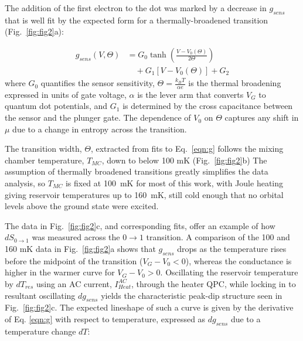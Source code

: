 \documentclass[twocolumn,showpacs,preprintnumbers,amsmath,amssymb,pra,aps,superscriptaddress]{revtex4-1}
\begin{document}
The addition of the first electron to the dot was marked by a decrease in $g_{sens}$ that is well fit by the expected form for a thermally-broadened transition (Fig.~\ref{fig:fig2}a):

%
\begin{align}
\label{eqn:g}
        g_{sens}(V,\Theta) &= G_0 \tanh\left(\frac{V-V_0(\Theta)}{2\Theta}\right)  \\
                        &\quad + G_1\left[V-V_0(\Theta)\right] + G_2 \nonumber
\end{align}
%
where $G_0$ quantifies the sensor sensitivity, $\Theta = \frac{k_B T}{\alpha e}$ is the thermal broadening expressed in units of gate voltage, $\alpha$ is the lever arm that converts $V_G$ to quantum dot potentials, and $G_1$ is determined by the cross capacitance between the sensor and the plunger gate. The dependence of $V_0$ on $\Theta$ captures any shift in $\mu$ due to a change in entropy across the transition.

The transition width, $\Theta$, extracted from fits to Eq.~\ref{eqn:g} follows the mixing chamber temperature, $T_{MC}$, down to below 100 mK (Fig.~\ref{fig:fig2}b)
The assumption of thermally broadened transitions greatly simplifies the data analysis, so $T_{MC}$ is fixed at \SI{100}{\milli\kelvin} for most of this work, with Joule heating giving reservoir temperatures up to \SI{160}{\milli\kelvin}, still cold enough that no orbital levels above the ground state were excited.

The data in Fig.~\ref{fig:fig2}c, and corresponding fits, offer an example of how $dS_{0\rightarrow 1}$ was measured across the $0 \rightarrow 1$ transition. A comparison of the 100 and 160 mK data in Fig.~\ref{fig:fig2}a shows that $g_{sens}$ drops as the temperature rises before the midpoint of the transition ($V_G-V_0<0$), whereas the conductance is higher in the warmer curve for $V_G-V_0>0$.   Oscillating the reservoir temperature by $dT_{res}$ using an AC current, $I^{AC}_{Heat}$, through the heater QPC, while locking in to resultant oscillating $dg_{sens}$ yields the characteristic peak-dip structure seen in Fig.~\ref{fig:fig2}c.  The expected lineshape of such a curve is given by the derivative of Eq. \ref{eqn:g} with respect to temperature, expressed as $dg_{sens}$ due to a temperature change $dT$:
\end{document}
